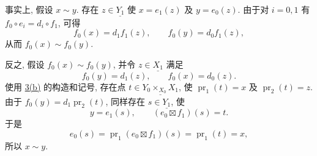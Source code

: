 事实上, 假设 \(x\sim y\). 存在 \(z\in\underline{Y_1}\)
使 \(x=e_1(z)\) 及 \(y=e_0(z)\).
由于对 \(i=0,1\) 有 \(f_0\circ e_i=d_i\circ f_1\), 可得
\[
  f_0(x)=d_1f_1(z),\qquad f_0(y)=d_0f_1(z),
\]
从而 \(f_0(x)\sim f_0(y)\).

反之, 假设 \(f_0(x)\sim f_0(y)\), 并令
\(z\in\underline{X_1}\) 满足
\[
  f_0(y)=d_1(z),\qquad f_0(x)=d_0(z).
\]
使用 \hyperref[par:sga3-V-3-b]{3(b)} 的构造和记号,
存在点 \(t\in\underline{Y_0\times_{X_0}X_1}\),
使 \(\operatorname{pr}_1(t)=x\) 及 \(\operatorname{pr}_2(t)=z\).
由于 \(f_0(y)=d_1\operatorname{pr}_2(t)\), 同样存在
\(s\in\underline{Y_1}\), 使
\[
  y=e_1(s),\qquad (e_0\boxtimes f_1)(s)=t.
\]
于是
\[
  e_0(s)=\operatorname{pr}_1(e_0\boxtimes f_1)(s)
  =\operatorname{pr}_1(t)=x,
\]
所以 \(x\sim y\).
